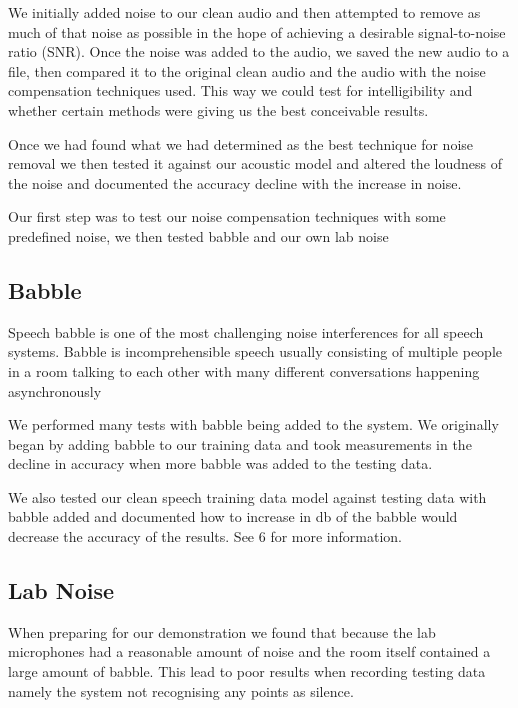 \documentclass[	DIV=calc,%
							paper=a4,%
							fontsize=9.8pt,%
							twocolumn]{scrartcl}	 					%
\begin{document}
We initially added noise to our clean audio and then attempted to remove as much of that noise as possible in the hope of achieving a desirable signal-to-noise ratio (SNR). Once the noise was added to the audio, we saved the new audio to a file, then compared it to the original clean audio and the audio with the noise compensation techniques used. This way we could test for intelligibility and whether certain methods were giving us the best conceivable results. 

Once we had found what we had determined as the best technique for noise removal we then tested it against our acoustic model and altered the loudness of the noise and documented the accuracy decline with the increase in noise.

Our first step was to test our noise compensation techniques with some predefined noise, we then tested babble and our own lab noise

\subsection{Babble}
Speech babble is one of the most challenging noise interferences for all speech systems. Babble is incomprehensible speech usually consisting of multiple people in a room talking to each other with many different conversations happening asynchronously

We performed many tests with babble being added to the system. We originally began by adding babble to our training data and took measurements in the decline in accuracy when more babble was added to the testing data. 

We also tested our clean speech training data model against testing data with babble added and documented how to increase in db of the babble would decrease the accuracy of the results. See 6 for more information.
\subsection{Lab Noise}
When preparing for our demonstration we found that because the lab microphones had a reasonable amount of noise and the room itself contained a large amount of babble. This lead to poor results when recording testing data namely the system not recognising any points as silence.
\end{document}
